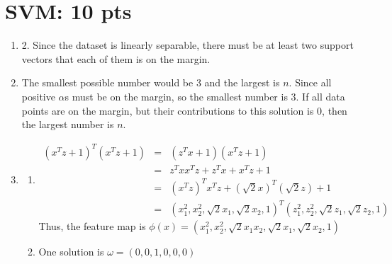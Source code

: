 \documentclass[12pt]{article}
\begin{document}
\section{SVM: 10 pts}
\begin{enumerate}
\item 2. Since the dataset is linearly separable, there must be at least two support vectors that each of them is on the margin.
\item The smallest possible number would be 3 and the largest is $n$. Since all positive $\alpha$s must be on the margin, so the smallest number is 3.
      If all data points are on the margin, but their contributions to this solution is 0, then the largest number is $n$.
\item \begin{enumerate}
    \item \begin{eqnarray}
        (x^{T}z+1)^{T}(x^{T}z+1) &=& (z^{T}x+1)(x^{T}z+1) \nonumber
        \\ &=& z^{T}xx^{T}z + z^{T}x + x^{T}z + 1 \nonumber
        \\ &=& (x^{T}z)^{T}x^{T}z + (\sqrt{2} x)^{T}(\sqrt{2} z) + 1 \nonumber
        \\ &=& (x_{1}^{2}, x_{2}^{2}, \sqrt{2}x_{1}, \sqrt{2}x_{2}, 1)^{T} (z_{1}^{2}, z_{2}^{2}, \sqrt{2}z_{1}, \sqrt{2}z_{2}, 1) \nonumber
    \end{eqnarray}
    Thus, the feature map is $\phi(x) = (x_{1}^{2}, x_{2}^{2}, \sqrt{2}x_{1}x_{2}, \sqrt{2}x_{1}, \sqrt{2}x_{2}, 1)$
    \item One solution is $\omega = (0, 0, 1, 0, 0, 0)$
\end{enumerate}

\end{enumerate}
\end{document}
